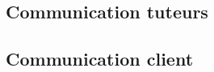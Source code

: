 \documentclass[asi]{picInsa}
\begin{document}
\subsection{Communication tuteurs}

\subsection{Communication client}





\begin{appendix}
\listoffigures
{}
	 
\listoftables
{}
\end{appendix}
\pageQuatriemeCouverture
\end{document}

